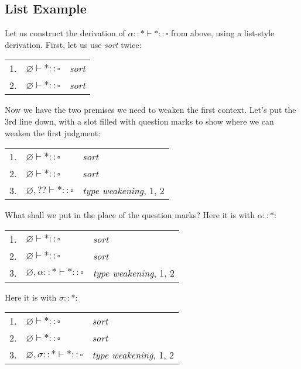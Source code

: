 \documentclass{book}
\numberwithin{equation}{chapter}
\begin{document}
\subsection{List Example}

Let us construct the derivation of $\alpha :: \ast \vdash \ast :: \square$ from above, using a list-style derivation. First, let us use \textit{sort} twice:

\begin{center}
\begin{tabular}[t]{l l l}
1. & $\varnothing \vdash \ast :: \square$ & \textit{sort} \\
2. & $\varnothing \vdash \ast :: \square$ & \textit{sort}
\end{tabular}
\end{center}

\noindent
Now we have the two premises we need to weaken the first context. Let's put the 3rd line down, with a slot filled with question marks to show where we can weaken the first judgment:

\begin{center}
\begin{tabular}[t]{l l l}
1. & $\varnothing \vdash \ast :: \square$ & \textit{sort} \\
2. & $\varnothing \vdash \ast :: \square$ & \textit{sort} \\
3. & $\varnothing, ?? \vdash \ast :: \square$ & \textit{type weakening}, 1, 2 \\
\end{tabular}
\end{center}

\noindent
What shall we put in the place of the question marks? Here it is with $\alpha :: \ast$:

\begin{center}
\begin{tabular}[t]{l l l}
1. & $\varnothing \vdash \ast :: \square$ & \textit{sort} \\
2. & $\varnothing \vdash \ast :: \square$ & \textit{sort} \\
3. & $\varnothing, \alpha :: \ast \vdash \ast :: \square$ & \textit{type weakening}, 1, 2 \\
\end{tabular}
\end{center}

\noindent
Here it is with $\sigma :: \ast$:

\begin{center}
\begin{tabular}[t]{l l l}
1. & $\varnothing \vdash \ast :: \square$ & \textit{sort} \\
2. & $\varnothing \vdash \ast :: \square$ & \textit{sort} \\
3. & $\varnothing, \sigma :: \ast \vdash \ast :: \square$ & \textit{type weakening}, 1, 2 \\
\end{tabular}
\end{center}
\end{document}
